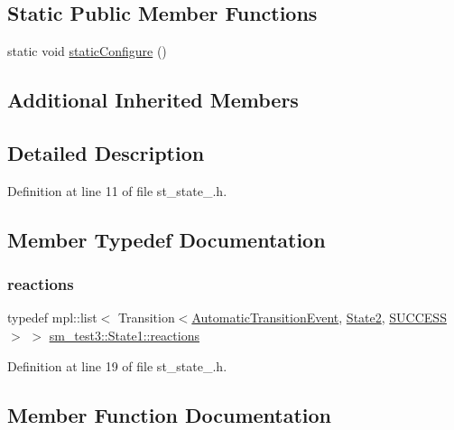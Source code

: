 \subsection*{Static Public Member Functions}
\begin{DoxyCompactItemize}
\item 
static void \hyperlink{structsm__test3_1_1State1_a6b3bc502567a4c4689a519eca1bde56d}{static\+Configure} ()
\end{DoxyCompactItemize}
\subsection*{Additional Inherited Members}


\subsection{Detailed Description}


Definition at line 11 of file st\+\_\+state\+\_.\+h.



\subsection{Member Typedef Documentation}
\mbox{\label{structsm__test3_1_1State1_af03c994bf71ae8540145a45d59aa4400}} 
\subsubsection{\texorpdfstring{reactions}{reactions}}
{\footnotesize\ttfamily typedef mpl\+::list$<$ Transition$<$\hyperlink{structsm__test3_1_1AutomaticTransitionEvent}{Automatic\+Transition\+Event}, \hyperlink{structsm__test3_1_1State2}{State2}, \hyperlink{classSUCCESS}{S\+U\+C\+C\+E\+SS}$>$ $>$ \hyperlink{structsm__test3_1_1State1_af03c994bf71ae8540145a45d59aa4400}{sm\+\_\+test3\+::\+State1\+::reactions}}



Definition at line 19 of file st\+\_\+state\+\_.\+h.



\subsection{Member Function Documentation}
\mbox{\label{structsm__test3_1_1State1_adffc862b4ed826bb2807e921638e2d4a}} 
